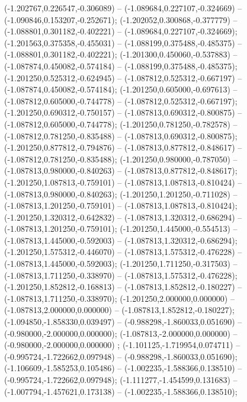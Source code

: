  (-1.202767,0.226547,-0.306089) -- (-1.089684,0.227107,-0.324669) -- (-1.090846,0.153207,-0.252671);
 (-1.202052,0.300868,-0.377779) -- (-1.088801,0.301182,-0.402221) -- (-1.089684,0.227107,-0.324669);
 (-1.201563,0.375358,-0.455031) -- (-1.088199,0.375488,-0.485375) -- (-1.088801,0.301182,-0.402221);
 (-1.201300,0.450060,-0.537883) -- (-1.087874,0.450082,-0.574184) -- (-1.088199,0.375488,-0.485375);
 (-1.201250,0.525312,-0.624945) -- (-1.087812,0.525312,-0.667197) -- (-1.087874,0.450082,-0.574184);
 (-1.201250,0.605000,-0.697613) -- (-1.087812,0.605000,-0.744778) -- (-1.087812,0.525312,-0.667197);
 (-1.201250,0.690312,-0.750157) -- (-1.087813,0.690312,-0.800875) -- (-1.087812,0.605000,-0.744778);
 (-1.201250,0.781250,-0.782578) -- (-1.087812,0.781250,-0.835488) -- (-1.087813,0.690312,-0.800875);
 (-1.201250,0.877812,-0.794876) -- (-1.087813,0.877812,-0.848617) -- (-1.087812,0.781250,-0.835488);
 (-1.201250,0.980000,-0.787050) -- (-1.087813,0.980000,-0.840263) -- (-1.087813,0.877812,-0.848617);
 (-1.201250,1.087813,-0.759101) -- (-1.087813,1.087813,-0.810424) -- (-1.087813,0.980000,-0.840263);
 (-1.201250,1.201250,-0.711028) -- (-1.087813,1.201250,-0.759101) -- (-1.087813,1.087813,-0.810424);
 (-1.201250,1.320312,-0.642832) -- (-1.087813,1.320312,-0.686294) -- (-1.087813,1.201250,-0.759101);
 (-1.201250,1.445000,-0.554513) -- (-1.087813,1.445000,-0.592003) -- (-1.087813,1.320312,-0.686294);
 (-1.201250,1.575312,-0.446070) -- (-1.087813,1.575312,-0.476228) -- (-1.087813,1.445000,-0.592003);
 (-1.201250,1.711250,-0.317503) -- (-1.087813,1.711250,-0.338970) -- (-1.087813,1.575312,-0.476228);
 (-1.201250,1.852812,-0.168813) -- (-1.087813,1.852812,-0.180227) -- (-1.087813,1.711250,-0.338970);
 (-1.201250,2.000000,0.000000) -- (-1.087813,2.000000,0.000000) -- (-1.087813,1.852812,-0.180227);
 (-1.094850,-1.858330,0.039497) -- (-0.988298,-1.860033,0.051690) -- (-0.980000,-2.000000,0.000000);
 (-1.087813,-2.000000,0.000000) -- (-0.980000,-2.000000,0.000000) ;
 (-1.101125,-1.719954,0.074711) -- (-0.995724,-1.722662,0.097948) -- (-0.988298,-1.860033,0.051690);
 (-1.106609,-1.585253,0.105486) -- (-1.002235,-1.588366,0.138510) -- (-0.995724,-1.722662,0.097948);
 (-1.111277,-1.454599,0.131683) -- (-1.007794,-1.457621,0.173138) -- (-1.002235,-1.588366,0.138510);
